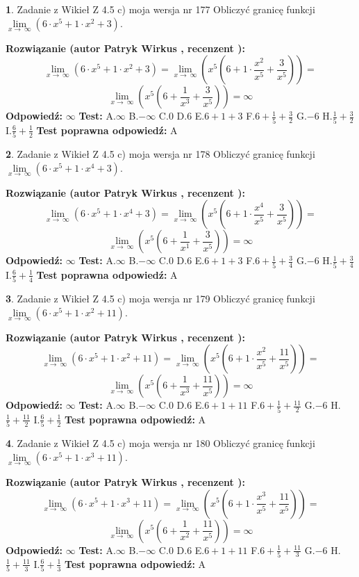 \documentclass[12pt, a4paper]{article}
\theoremstyle{definition} %
\newtheorem{zad}{}
\newcommand{\zadStart}[1]{\begin{zad}#1\newline}
\newcommand{\zadStop}{\end{zad}}
\newcommand{\rozwStart}[2]{\noindent \textbf{Rozwiązanie (autor #1 , recenzent #2): }\newline}
\newcommand{\rozwStop}{\newline}
\newcommand{\odpStart}{\noindent \textbf{Odpowiedź:}\newline}
\newcommand{\odpStop}{\newline}
\newcommand{\testStart}{\noindent \textbf{Test:}\newline}
\newcommand{\testStop}{\newline}
\newcommand{\kluczStart}{\noindent \textbf{Test poprawna odpowiedź:}\newline}
\newcommand{\kluczStop}{\newline}
\begin{document}
\zadStart{Zadanie z Wikieł Z 4.5 c) moja wersja nr 177}
Obliczyć granicę funkcji  $\lim\limits_{x\to\ \infty}(6 \cdot x^{5}+1 \cdot x^{2}+3)$.
\zadStop
\rozwStart{Patryk Wirkus}{}
$$\lim\limits_{x\to\ \infty}(6 \cdot x^{5}+1 \cdot x^{2}+3) = \lim\limits_{x\to\ \infty}(x^{5}(6 +1 \cdot \frac{x^{2}}{x^{5}}+\frac{3}{x^{5}})) =$$ $$\lim\limits_{x\to\ \infty}(x^{5}(6 +\frac{1}{x^{3}}+\frac{3}{x^{5}})) =\infty$$
\rozwStop
\odpStart
$\infty$
\odpStop
\testStart
A.$\infty$ B.$-\infty$ C.$0$ D.$6$ E.$6 + 1 + 3$
F.$6+\frac{1}{5}+\frac{3}{2}$ G.$-6$
H.$\frac{1}{5}+\frac{3}{2}$
I.$\frac{6}{5}+\frac{1}{2}$
\testStop
\kluczStart
A
\kluczStop



\zadStart{Zadanie z Wikieł Z 4.5 c) moja wersja nr 178}
Obliczyć granicę funkcji  $\lim\limits_{x\to\ \infty}(6 \cdot x^{5}+1 \cdot x^{4}+3)$.
\zadStop
\rozwStart{Patryk Wirkus}{}
$$\lim\limits_{x\to\ \infty}(6 \cdot x^{5}+1 \cdot x^{4}+3) = \lim\limits_{x\to\ \infty}(x^{5}(6 +1 \cdot \frac{x^{4}}{x^{5}}+\frac{3}{x^{5}})) =$$ $$\lim\limits_{x\to\ \infty}(x^{5}(6 +\frac{1}{x^{1}}+\frac{3}{x^{5}})) =\infty$$
\rozwStop
\odpStart
$\infty$
\odpStop
\testStart
A.$\infty$ B.$-\infty$ C.$0$ D.$6$ E.$6 + 1 + 3$
F.$6+\frac{1}{5}+\frac{3}{4}$ G.$-6$
H.$\frac{1}{5}+\frac{3}{4}$
I.$\frac{6}{5}+\frac{1}{4}$
\testStop
\kluczStart
A
\kluczStop



\zadStart{Zadanie z Wikieł Z 4.5 c) moja wersja nr 179}
Obliczyć granicę funkcji  $\lim\limits_{x\to\ \infty}(6 \cdot x^{5}+1 \cdot x^{2}+11)$.
\zadStop
\rozwStart{Patryk Wirkus}{}
$$\lim\limits_{x\to\ \infty}(6 \cdot x^{5}+1 \cdot x^{2}+11) = \lim\limits_{x\to\ \infty}(x^{5}(6 +1 \cdot \frac{x^{2}}{x^{5}}+\frac{11}{x^{5}})) =$$ $$\lim\limits_{x\to\ \infty}(x^{5}(6 +\frac{1}{x^{3}}+\frac{11}{x^{5}})) =\infty$$
\rozwStop
\odpStart
$\infty$
\odpStop
\testStart
A.$\infty$ B.$-\infty$ C.$0$ D.$6$ E.$6 + 1 + 11$
F.$6+\frac{1}{5}+\frac{11}{2}$ G.$-6$
H.$\frac{1}{5}+\frac{11}{2}$
I.$\frac{6}{5}+\frac{1}{2}$
\testStop
\kluczStart
A
\kluczStop



\zadStart{Zadanie z Wikieł Z 4.5 c) moja wersja nr 180}
Obliczyć granicę funkcji  $\lim\limits_{x\to\ \infty}(6 \cdot x^{5}+1 \cdot x^{3}+11)$.
\zadStop
\rozwStart{Patryk Wirkus}{}
$$\lim\limits_{x\to\ \infty}(6 \cdot x^{5}+1 \cdot x^{3}+11) = \lim\limits_{x\to\ \infty}(x^{5}(6 +1 \cdot \frac{x^{3}}{x^{5}}+\frac{11}{x^{5}})) =$$ $$\lim\limits_{x\to\ \infty}(x^{5}(6 +\frac{1}{x^{2}}+\frac{11}{x^{5}})) =\infty$$
\rozwStop
\odpStart
$\infty$
\odpStop
\testStart
A.$\infty$ B.$-\infty$ C.$0$ D.$6$ E.$6 + 1 + 11$
F.$6+\frac{1}{5}+\frac{11}{3}$ G.$-6$
H.$\frac{1}{5}+\frac{11}{3}$
I.$\frac{6}{5}+\frac{1}{3}$
\testStop
\kluczStart
A
\kluczStop
\end{document}
